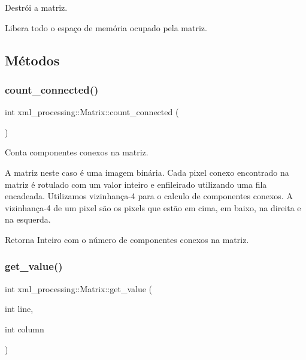 Destrói a matriz. 

Libera todo o espaço de memória ocupado pela matriz. 

\subsection{Métodos}
\mbox{\label{classxml__processing_1_1Matrix_abdb4dca9e7b39f73ec02b45a5818905f}} 
\subsubsection{\texorpdfstring{count\+\_\+connected()}{count\_connected()}}
{\footnotesize\ttfamily int xml\+\_\+processing\+::\+Matrix\+::count\+\_\+connected (\begin{DoxyParamCaption}{ }\end{DoxyParamCaption})}



Conta componentes conexos na matriz. 

A matriz neste caso é uma imagem binária. Cada pixel conexo encontrado na matriz é rotulado com um valor inteiro e enfileirado utilizando uma fila encadeada. Utilizamos vizinhança-\/4 para o calculo de componentes conexos. A vizinhança-\/4 de um pixel são os pixels que estão em cima, em baixo, na direita e na esquerda.

\begin{DoxyReturn}{Retorna}
Inteiro com o número de componentes conexos na matriz. 
\end{DoxyReturn}
\mbox{\label{classxml__processing_1_1Matrix_af11b820c974f7cb01372ce2f705ac3bd}} 
\subsubsection{\texorpdfstring{get\+\_\+value()}{get\_value()}}
{\footnotesize\ttfamily int xml\+\_\+processing\+::\+Matrix\+::get\+\_\+value (\begin{DoxyParamCaption}\item[{int}]{line,  }\item[{int}]{column }\end{DoxyParamCaption})}



